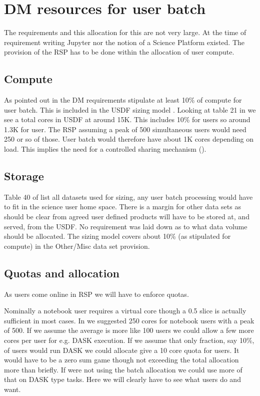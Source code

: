 \section{DM resources for user batch} \label{sec:resources}
The requirements and this allocation for this are not very large.
At the time of requirement writing Jupyter nor the notion of a Science Platform existed.
The provision of the RSP has to be done within the allocation of user compute.

\subsection{Compute} \label{sec:compute}
As pointed out in  the DM requirements stipulate at least
10\% of compute for user batch.
This is included in the USDF sizing model .
Looking at table 21 in  we see a total cores in USDF  at around 15K.
This includes 10\% for users so around 1.3K for user.
The RSP assuming a peak of 500 simultaneous users would need 250 or so of those.
User batch would therefore have about 1K cores depending on load.
This implies the need for a controlled sharing mechanism ().



\subsection{Storage}
Table 40 of  list all datasets used for sizing,
any user batch processing would have to fit in the science user home space.
There is a margin for other data sets as should be clear from  agreed user defined products will have to be stored at, and served, from the USDF.
No requirement was laid down as to what data volume should be allocated.
The sizing model covers about 10\%  (as stipulated for compute) in the Other/Misc data set provision.


\subsection{Quotas and allocation} \label{sec:quotas}

As users come online in RSP we will have to enforce quotas.

Nominally a notebook user requires a virtual core though a 0.5 slice is actually sufficient in most cases.
In  we suggested 250 cores for notebook users with a peak of 500. If we assume the average is more like 100 users we could allow a few more cores per user for e.g. DASK execution. If we assume that only  fraction, say 10\%,  of users would run DASK we could allocate give a 10 core quota for users.
It would have to be a zero sum game though not exceeding the total allocation more than briefly.
If were not using the batch allocation we could use more of that on DASK type tasks.
Here we will clearly have to see what users do and want.

